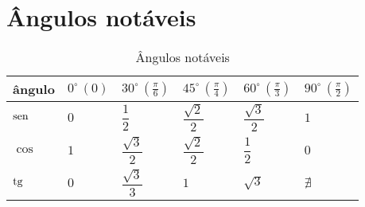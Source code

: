 \section{Ângulos notáveis}
	\begin{table}[htb]
		\caption{Ângulos notáveis}
		\label{angulos_notaveis}
		\centering
		\begin{tabular}{|l|l|l|l|l|l|}
			\hline
			ângulo & $0^\circ\, (0)$ & $30^\circ\, \left(\frac{\pi}{6}\right)$ & $45^\circ\, \left(\frac{\pi}{4}\right)$ & $60^\circ\, \left(\frac{\pi}{3}\right)$ & $90^\circ\, \left(\frac{\pi}{2}\right)$ \\ \hline
			$\operatorname{sen}$ & $0$             & $\dfrac{1}{2}$                          & $\dfrac{\sqrt{2}}{2}$                   & $\dfrac{\sqrt{3}}{2}$                   & $1$                                     \\ \hline
			$\cos$ & $1$             & $\dfrac{\sqrt{3}}{2}$                   & $\dfrac{\sqrt{2}}{2}$                   & $\dfrac{1}{2}$                          & $0$                                     \\ \hline
			$\operatorname{tg}$  & $0$             & $\dfrac{\sqrt{3}}{3}$                   & $1$                                     & $\sqrt{3}$                              & $\nexists$                                \\ \hline
		\end{tabular}		
	\end{table}